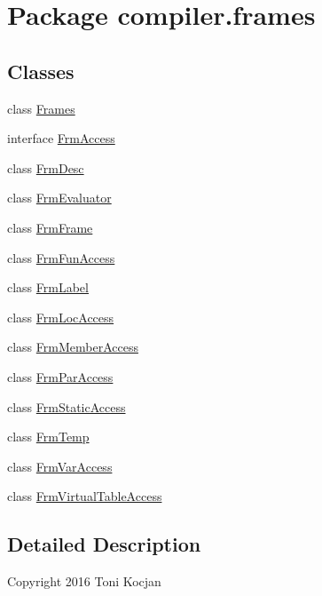 \hypertarget{namespacecompiler_1_1frames}{}\section{Package compiler.\+frames}
\label{namespacecompiler_1_1frames}
\subsection*{Classes}
\begin{DoxyCompactItemize}
\item 
class \hyperlink{classcompiler_1_1frames_1_1_frames}{Frames}
\item 
interface \hyperlink{interfacecompiler_1_1frames_1_1_frm_access}{Frm\+Access}
\item 
class \hyperlink{classcompiler_1_1frames_1_1_frm_desc}{Frm\+Desc}
\item 
class \hyperlink{classcompiler_1_1frames_1_1_frm_evaluator}{Frm\+Evaluator}
\item 
class \hyperlink{classcompiler_1_1frames_1_1_frm_frame}{Frm\+Frame}
\item 
class \hyperlink{classcompiler_1_1frames_1_1_frm_fun_access}{Frm\+Fun\+Access}
\item 
class \hyperlink{classcompiler_1_1frames_1_1_frm_label}{Frm\+Label}
\item 
class \hyperlink{classcompiler_1_1frames_1_1_frm_loc_access}{Frm\+Loc\+Access}
\item 
class \hyperlink{classcompiler_1_1frames_1_1_frm_member_access}{Frm\+Member\+Access}
\item 
class \hyperlink{classcompiler_1_1frames_1_1_frm_par_access}{Frm\+Par\+Access}
\item 
class \hyperlink{classcompiler_1_1frames_1_1_frm_static_access}{Frm\+Static\+Access}
\item 
class \hyperlink{classcompiler_1_1frames_1_1_frm_temp}{Frm\+Temp}
\item 
class \hyperlink{classcompiler_1_1frames_1_1_frm_var_access}{Frm\+Var\+Access}
\item 
class \hyperlink{classcompiler_1_1frames_1_1_frm_virtual_table_access}{Frm\+Virtual\+Table\+Access}
\end{DoxyCompactItemize}


\subsection{Detailed Description}
Copyright 2016 Toni Kocjan

